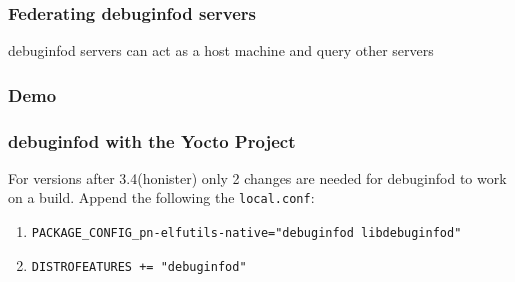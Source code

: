 \documentclass[8pt]{beamer}
\begin{document}
\begin{frame}[fragile]
   \frametitle{Federating debuginfod servers}
   debuginfod servers can act as a host machine and query other servers
\end{frame}

\begin{frame}
   \frametitle{Demo}
\end{frame}

\begin{frame}[fragile]
   \frametitle{debuginfod with the Yocto Project}
   For versions after 3.4(honister) only 2 changes are needed for debuginfod
   to work on a build. Append the following the \verb|local.conf|:
   \begin{enumerate}
      \item \verb|PACKAGE_CONFIG_pn-elfutils-native="debuginfod libdebuginfod"|
      \item \verb|DISTROFEATURES += "debuginfod"|
   \end{enumerate}
\end{frame}
\end{document}
